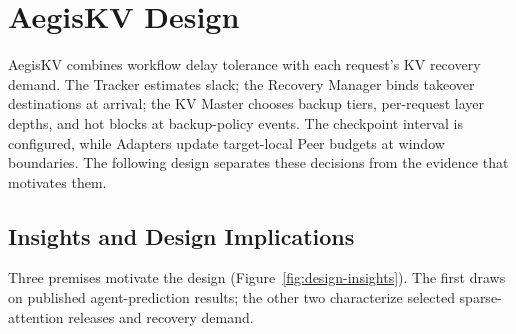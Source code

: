 \section{AegisKV Design}
\label{sec:design}

AegisKV combines workflow delay tolerance with each request's KV
recovery demand. The Tracker estimates slack; the Recovery Manager binds
takeover destinations at arrival; the KV Master chooses backup tiers,
per-request layer depths, and hot blocks at backup-policy events.
The checkpoint interval is configured, while Adapters update target-local
Peer budgets at window boundaries. The following design
separates these decisions from the evidence that motivates them.

\subsection{Insights and Design Implications}
\label{sec:design-insights}

Three premises motivate the design (Figure~\ref{fig:design-insights}).
The first draws on published agent-prediction results; the other two
characterize selected sparse-attention releases and recovery demand.

